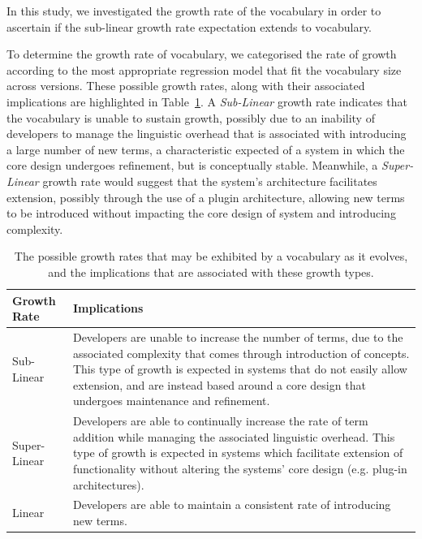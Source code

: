 In this study, we investigated the growth rate of the vocabulary in order to ascertain if the sub-linear growth rate expectation extends to vocabulary.

To determine the growth rate of vocabulary, we categorised the rate of growth according to the most appropriate regression model that fit the vocabulary size across versions. These possible growth rates, along with their associated implications are highlighted in Table~\ref{tab:vocab_growth_rate_implications}. A \emph{Sub-Linear} growth rate indicates that the vocabulary is unable to sustain growth, possibly due to an inability of developers to manage the linguistic overhead that is associated with introducing a large number of new terms, a characteristic expected of a system in which the core design undergoes refinement, but is conceptually stable. Meanwhile, a \emph{Super-Linear} growth rate would suggest that the system's architecture facilitates extension, possibly through the use of a plugin architecture, allowing new terms to be introduced without impacting the core design of system and introducing complexity.

\begin{table}[t]
\centering
\begin{tabular}{|p{}|p{}|}
\hline
{\bf Growth Rate} & {\bf Implications}\\
\hline
\hline
Sub-Linear
&
Developers are unable to increase the number of terms, due to the associated complexity that comes through introduction of concepts. This type of growth is expected in systems that do not easily allow extension, and are instead based around a core design that undergoes maintenance and refinement. 
\\
\hline
Super-Linear
&
Developers are able to continually increase the rate of term addition while managing the associated linguistic overhead. This type of growth is expected in systems which facilitate extension of functionality without altering the systems' core design (e.g. plug-in architectures).
\\
\hline
Linear
&
Developers are able to maintain a consistent rate of introducing new terms.
\\
\hline
\end{tabular}
\vspace{0.2cm}
\caption{The possible growth rates that may be exhibited by a vocabulary as it evolves, and the implications that are associated with these growth types.}
\label{tab:vocab_growth_rate_implications}
\vspace{-0.2cm}
\end{table}

